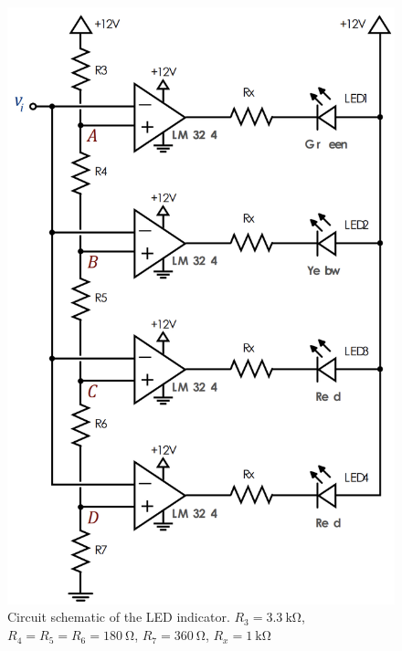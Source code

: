 \documentclass[lettersize,journal]{IEEEtran}
\begin{document}
\begin{figure}[H]
    \centering
    \includegraphics[width=\linewidth]{images/led_indicator.png}
    \caption{Circuit schematic of the LED indicator. $R_3 = \SI{3.3}{\kilo \ohm}$, $R_4 = R_5 = R_6 = \SI{180}{\ohm}$, $R_7 = \SI{360}{\ohm}$, $R_x = \SI{1}{\kilo \ohm}$}
    \label{fig:led_indicator}
\end{figure}
\end{document}
